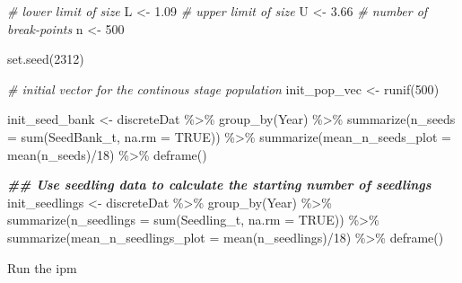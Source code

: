 \documentclass[
]{article}
\newenvironment{Shaded}{\begin{snugshade}}{\end{snugshade}}
\newcommand{\AttributeTok}[1]{\textcolor[rgb]{0.77,0.63,0.00}{#1}}
\newcommand{\CommentTok}[1]{\textcolor[rgb]{0.56,0.35,0.01}{\textit{#1}}}
\newcommand{\ConstantTok}[1]{\textcolor[rgb]{0.00,0.00,0.00}{#1}}
\newcommand{\DecValTok}[1]{\textcolor[rgb]{0.00,0.00,0.81}{#1}}
\newcommand{\DocumentationTok}[1]{\textcolor[rgb]{0.56,0.35,0.01}{\textbf{\textit{#1}}}}
\newcommand{\FloatTok}[1]{\textcolor[rgb]{0.00,0.00,0.81}{#1}}
\newcommand{\FunctionTok}[1]{\textcolor[rgb]{0.00,0.00,0.00}{#1}}
\newcommand{\NormalTok}[1]{#1}
\newcommand{\OtherTok}[1]{\textcolor[rgb]{0.56,0.35,0.01}{#1}}
\newcommand{\SpecialCharTok}[1]{\textcolor[rgb]{0.00,0.00,0.00}{#1}}
\begin{document}
\begin{Shaded}
\begin{Highlighting}[]
\CommentTok{\# lower limit of size}
\NormalTok{L }\OtherTok{\textless{}{-}} \FloatTok{1.09}
\CommentTok{\# upper limit of size}
\NormalTok{U }\OtherTok{\textless{}{-}} \FloatTok{3.66}
\CommentTok{\# number of break{-}points}
\NormalTok{n }\OtherTok{\textless{}{-}} \DecValTok{500}

\FunctionTok{set.seed}\NormalTok{(}\DecValTok{2312}\NormalTok{)}

\CommentTok{\# initial vector for the continous stage population}
\NormalTok{init\_pop\_vec   }\OtherTok{\textless{}{-}} \FunctionTok{runif}\NormalTok{(}\DecValTok{500}\NormalTok{)}

\NormalTok{init\_seed\_bank }\OtherTok{\textless{}{-}}\NormalTok{  discreteDat }\SpecialCharTok{\%\textgreater{}\%} 
  \FunctionTok{group\_by}\NormalTok{(Year) }\SpecialCharTok{\%\textgreater{}\%} 
  \FunctionTok{summarize}\NormalTok{(}\AttributeTok{n\_seeds =} \FunctionTok{sum}\NormalTok{(SeedBank\_t, }\AttributeTok{na.rm =} \ConstantTok{TRUE}\NormalTok{)) }\SpecialCharTok{\%\textgreater{}\%} 
  \FunctionTok{summarize}\NormalTok{(}\AttributeTok{mean\_n\_seeds\_plot =} \FunctionTok{mean}\NormalTok{(n\_seeds)}\SpecialCharTok{/}\DecValTok{18}\NormalTok{) }\SpecialCharTok{\%\textgreater{}\%} 
  \FunctionTok{deframe}\NormalTok{()}

\DocumentationTok{\#\# Use seedling data to calculate the starting number of seedlings}
\NormalTok{init\_seedlings }\OtherTok{\textless{}{-}}\NormalTok{ discreteDat }\SpecialCharTok{\%\textgreater{}\%} 
  \FunctionTok{group\_by}\NormalTok{(Year) }\SpecialCharTok{\%\textgreater{}\%} 
  \FunctionTok{summarize}\NormalTok{(}\AttributeTok{n\_seedlings =} \FunctionTok{sum}\NormalTok{(Seedling\_t, }\AttributeTok{na.rm =} \ConstantTok{TRUE}\NormalTok{)) }\SpecialCharTok{\%\textgreater{}\%} 
  \FunctionTok{summarize}\NormalTok{(}\AttributeTok{mean\_n\_seedlings\_plot =} \FunctionTok{mean}\NormalTok{(n\_seedlings)}\SpecialCharTok{/}\DecValTok{18}\NormalTok{) }\SpecialCharTok{\%\textgreater{}\%} 
  \FunctionTok{deframe}\NormalTok{()}
\end{Highlighting}
\end{Shaded}

Run the ipm
\end{document}
